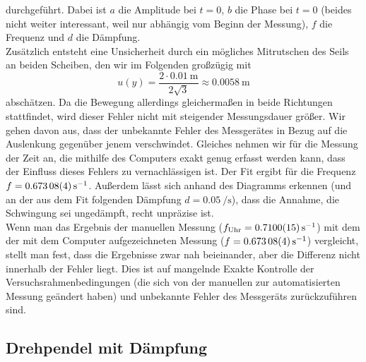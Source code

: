 \documentclass[
	a4paper,
	12pt,
	pagesize,
	ngerman
]{scrartcl}
\begin{document}
	durchgeführt. Dabei ist $a$ die Amplitude bei $t=0$, $b$ die Phase bei $t=0$  (beides nicht weiter interessant, weil nur abhängig vom Beginn der Messung), $f$ die Frequenz und $d$ die Dämpfung.\\
	Zusätzlich entsteht eine Unsicherheit durch ein mögliches Mitrutschen des Seils an beiden Scheiben, den wir im Folgenden großzügig mit 
	\begin{equation*}
		u(y) = \frac{2 \cdot \SI{0,01}{\meter}}{2 \sqrt{3}} \approx \SI{0,0058}{\meter}
	\end{equation*}
	abschätzen. Da die Bewegung allerdings gleichermaßen in beide Richtungen stattfindet, wird dieser Fehler nicht mit steigender Messungsdauer größer.
	Wir gehen davon aus, dass der unbekannte Fehler des Messgerätes in Bezug auf die Auslenkung gegenüber jenem verschwindet. Gleiches nehmen wir für die Messung der Zeit an, die mithilfe des Computers exakt genug erfasst werden kann, dass der Einfluss dieses Fehlers zu vernachlässigen ist.
	Der Fit ergibt für die Frequenz $ f = \SI{0,67308 \pm 0,00004}{\per \second} $.
	Außerdem lässt sich anhand des Diagramms erkennen (und an der aus dem Fit folgenden Dämpfung $ d= \SI{0,05}{\per \second} $), dass die Annahme, die Schwingung sei ungedämpft, recht unpräzise ist. \\
	Wenn man das Ergebnis der manuellen Messung ($f_\text{Uhr} = \SI{0,71 \pm 0,0015}{\per \second}$) mit dem der mit dem Computer aufgezeichneten Messung ($ f = \SI{0,67308 \pm 0,00004}{\per \second} $) vergleicht, stellt man fest, dass die Ergebnisse zwar nah beieinander, aber die Differenz nicht innerhalb der Fehler liegt.
	Dies ist auf mangelnde Exakte Kontrolle der Versuchsrahmenbedingungen (die sich von der manuellen zur automatisierten Messung geändert haben) und unbekannte Fehler des Messgeräts zurückzuführen sind.
	
	\subsection{Drehpendel mit Dämpfung}
	
\end{document}
